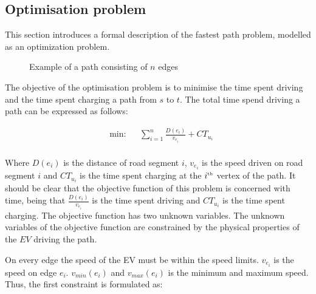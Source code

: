 \subsection{Optimisation problem}\label{sec:optiprob}
This section introduces a formal description of the fastest path problem, modelled as an optimization problem.

\begin{figure}[h!]
\centering
    \caption{Example of a path consisting of $n$ edges} \label{fig:pathexample}
\end{figure}


The objective of the optimisation problem is to minimise the time spent driving
and the time spent charging a path from $s$ to $t$. The total time spend driving a path can be expressed as follows:

\begin{equation*}
\begin{aligned} &
{\text{min:}}
& & \sum_{i=1}^{n} \frac{D(e_i)}{v_{e_i}} + CT_{u_i} \\
\end{aligned}
\end{equation*}\label{eq:objfunction}

Where $D(e_i)$ is the distance of road segment $i$, $v_{e_i}$ is the speed driven on road segment $i$ and $CT_{u_i}$ is the time spent charging at the $i^{\text{\tiny th}}$ vertex of the path. It should be clear that the objective function of this problem is concerned with time, being that $\frac{D(e_i)}{v_{e_i}}$ is the time spent driving and $CT_{u_i}$ is the time spent charging. The objective function has two unknown variables. The unknown variables of the objective function are constrained by the physical properties of the $EV$ driving the path.

On every edge the speed of the EV must be within the speed limits. $v_{e_i}$ is the speed on edge $e_i$. $v_{min}(e_i)$ and $v_{max}(e_i)$ is the minimum and maximum speed. Thus, the first constraint is formulated as:

